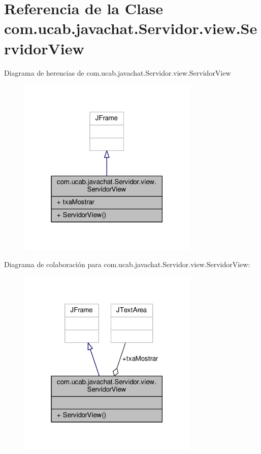 \hypertarget{classcom_1_1ucab_1_1javachat_1_1_servidor_1_1view_1_1_servidor_view}{\section{Referencia de la Clase com.\-ucab.\-javachat.\-Servidor.\-view.\-Servidor\-View}
\label{classcom_1_1ucab_1_1javachat_1_1_servidor_1_1view_1_1_servidor_view}
}


Diagrama de herencias de com.\-ucab.\-javachat.\-Servidor.\-view.\-Servidor\-View\nopagebreak
\begin{figure}[H]
\begin{center}
\leavevmode
\includegraphics[width=244pt]{classcom_1_1ucab_1_1javachat_1_1_servidor_1_1view_1_1_servidor_view__inherit__graph}
\end{center}
\end{figure}


Diagrama de colaboración para com.\-ucab.\-javachat.\-Servidor.\-view.\-Servidor\-View\-:\nopagebreak
\begin{figure}[H]
\begin{center}
\leavevmode
\includegraphics[width=244pt]{classcom_1_1ucab_1_1javachat_1_1_servidor_1_1view_1_1_servidor_view__coll__graph}
\end{center}
\end{figure}
